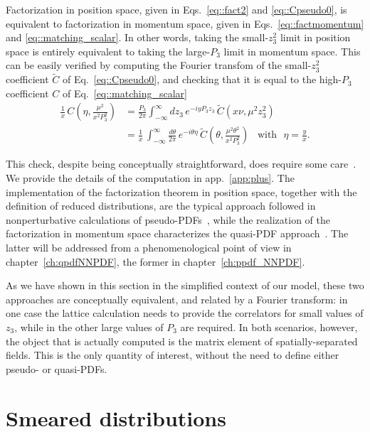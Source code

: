 Factorization in position space, given in Eqs.~\eqref{eq::fact2} and
\eqref{eq::Cpseudo0}, is equivalent to factorization in momentum space, given in
Eqs.~\eqref{eq::factmomentum} and \eqref{eq::matching_scalar}. In other words, taking
the small-$z_3^2$ limit in position space is entirely equivalent to taking the
large-$P_3$ limit in momentum space. This can be easily verified by computing
the Fourier transfom of the small-$z_3^2$ coefficient $\tilde{C}$ of
Eq.~\eqref{eq::Cpseudo0}, and checking that it is equal to the high-$P_3$
coefficient $C$ of Eq.~\eqref{eq::matching_scalar} 
\begin{align}
	\label{eq::check}
	\frac{1}{x}\,C\left(\eta,\frac{\mu^2}{x^2 P_3^2}\right) &= 
	\frac{P_3}{2\pi}\int_{-\infty}^{\infty} dz_3\, e^{-i y P_3 z_3 }\,
	\tilde{C}\left(x\nu, \mu^2 z_3^2 \right) \nonumber \\
	&= \frac{1}{x}\,\int_{-\infty}^{\infty}\frac{d\theta}{2\pi}\, e^{-i\theta\eta}\,
	\tilde{C}\left(\theta, \frac{\mu^2\theta^2}{x^2 P_3^2} \right)\,\,\,\,\, \text{with}\,\,\,\, \eta = \frac{y}{x}.
\end{align}

This check, despite being conceptually straightforward, does require some
care~\cite{Izubuchi:2018srq}. We provide the details of the computation in
app.~\ref{app:plus}.
%
The implementation of the factorization theorem in position space, together with
the definition of reduced distributions, are the typical approach followed in nonperturbative calculations of
pseudo-PDFs~\cite{Radyushkin:2017cyf,Orginos:2017kos,Joo:2019jct,Joo:2019bzr,Joo:2020spy,
Radyushkin:2019owq}, while the realization of the factorization in momentum
space characterizes the quasi-PDF
approach~\cite{PhysRevLett.110.262002,Alexandrou:2018pbm, Alexandrou:2019lfo,
Chai:2020nxw, Bhat:2020ktg}. The latter will be addressed from a phenomenological point of 
view in chapter~\ref{ch:qpdfNNPDF}, the former in chapter~\ref{ch:ppdf_NNPDF}.

As we have shown in this section in the simplified context of our model, these
two approaches are conceptually equivalent, and related by a Fourier transform:
in one case the lattice calculation needs to provide the correlators for  small
values of $z_3$, while in the other large values of $P_3$ are required. In both
scenarios, however, the object that is actually computed is the matrix element
of spatially-separated fields. This is the only quantity of interest, without
the need to define either pseudo- or quasi-PDFs.

\section{Smeared distributions}
\label{sec:flow}

